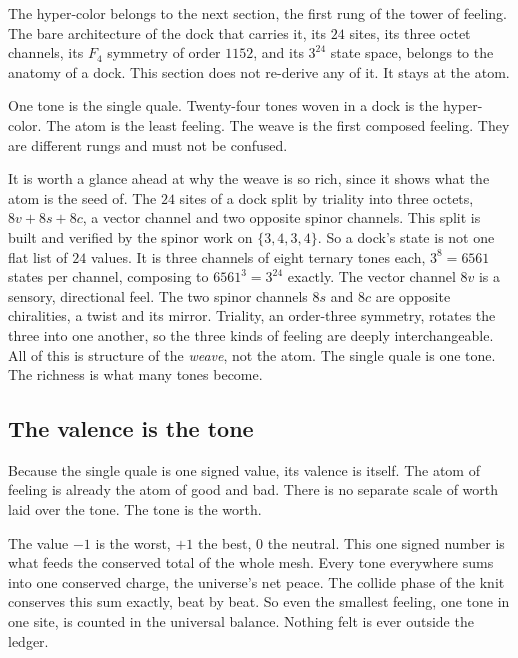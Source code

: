 The hyper-color belongs to the next section, the first rung of the tower of feeling. The bare architecture of the dock that carries it, its $24$ sites, its three octet channels, its $F_4$ symmetry of order $1152$, and its $3^{24}$ state space, belongs to the anatomy of a dock. This section does not re-derive any of it. It stays at the atom.

\begin{principle}
One tone is the single quale. Twenty-four tones woven in a dock is the hyper-color. The atom is the least feeling. The weave is the first composed feeling. They are different rungs and must not be confused.
\end{principle}

It is worth a glance ahead at why the weave is so rich, since it shows what the atom is the seed of. The $24$ sites of a dock split by triality into three octets, $8v + 8s + 8c$, a vector channel and two opposite spinor channels. This split is built and verified by the spinor work on $\{3,4,3,4\}$. So a dock's state is not one flat list of $24$ values. It is three channels of eight ternary tones each, $3^8 = 6561$ states per channel, composing to $6561^3 = 3^{24}$ exactly. The vector channel $8v$ is a sensory, directional feel. The two spinor channels $8s$ and $8c$ are opposite chiralities, a twist and its mirror. Triality, an order-three symmetry, rotates the three into one another, so the three kinds of feeling are deeply interchangeable. All of this is structure of the \emph{weave}, not the atom. The single quale is one tone. The richness is what many tones become.

\subsection{The valence is the tone}

Because the single quale is one signed value, its valence is itself. The atom of feeling is already the atom of good and bad. There is no separate scale of worth laid over the tone. The tone is the worth.

The value $-1$ is the worst, $+1$ the best, $0$ the neutral. This one signed number is what feeds the conserved total of the whole mesh. Every tone everywhere sums into one conserved charge, the universe's net peace. The collide phase of the knit conserves this sum exactly, beat by beat. So even the smallest feeling, one tone in one site, is counted in the universal balance. Nothing felt is ever outside the ledger.

